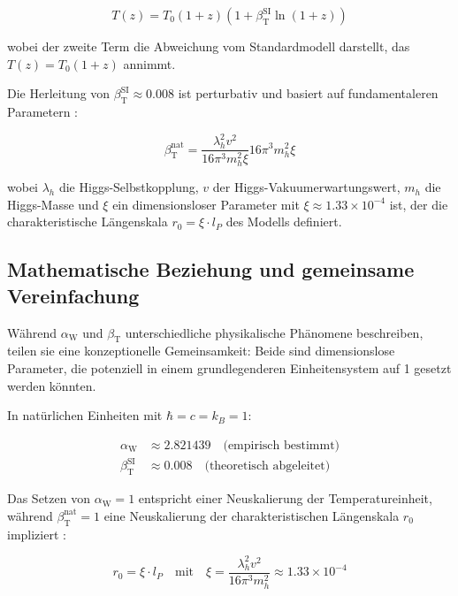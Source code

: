 \documentclass[12pt,a4paper]{article}
\newcommand{\betaT}{\beta_{\text{T}}}
\newcommand{\alphaW}{\alpha_{\text{W}}}
\begin{document}
	\begin{equation}
		T(z) = T_0 (1 + z) (1 + \betaT^{\text{SI}} \ln(1 + z))
	\end{equation}
	
	wobei der zweite Term die Abweichung vom Standardmodell darstellt, das \(T(z) = T_0 (1 + z)\) annimmt.
	
	Die Herleitung von \(\betaT^{\text{SI}} \approx 0.008\) ist perturbativ und basiert auf fundamentaleren Parametern \cite{pascher_params_2025}:
	
	\begin{equation}
		\betaT^{\text{nat}} = \frac{\lambda_h^2 v^2}{16\pi^3 m_h^2 \xi}{16\pi^3 m_h^2 \xi}
	\end{equation}
	
	wobei \(\lambda_h\) die Higgs-Selbstkopplung, \(v\) der Higgs-Vakuumerwartungswert, \(m_h\) die Higgs-Masse und \(\xi\) ein dimensionsloser Parameter mit \(\xi \approx 1.33 \times 10^{-4}\) ist, der die charakteristische Längenskala \(r_0 = \xi \cdot l_P\) des Modells definiert.
	
	\subsection{Mathematische Beziehung und gemeinsame Vereinfachung}
	\label{subsec:joint_simplification}
	
	Während \(\alphaW\) und \(\betaT\) unterschiedliche physikalische Phänomene beschreiben, teilen sie eine konzeptionelle Gemeinsamkeit: Beide sind dimensionslose Parameter, die potenziell in einem grundlegenderen Einheitensystem auf 1 gesetzt werden könnten.
	
	In natürlichen Einheiten mit \(\hbar = c = k_B = 1\):
	
	\begin{align}
		\alphaW &\approx 2.821439 \quad \text{(empirisch bestimmt)} \\
		\betaT^{\text{SI}} &\approx 0.008 \quad \text{(theoretisch abgeleitet)}
	\end{align}
	
	Das Setzen von \(\alphaW = 1\) entspricht einer Neuskalierung der Temperatureinheit, während \(\betaT^{\text{nat}} = 1\) eine Neuskalierung der charakteristischen Längenskala \(r_0\) impliziert \cite{pascher_params_2025}:
	
	\begin{equation}
		r_0 = \xi \cdot l_P \quad \text{mit} \quad \xi = \frac{\lambda_h^2 v^2}{16\pi^3 m_h^2} \approx 1.33 \times 10^{-4}
	\end{equation}
	
\end{document}
